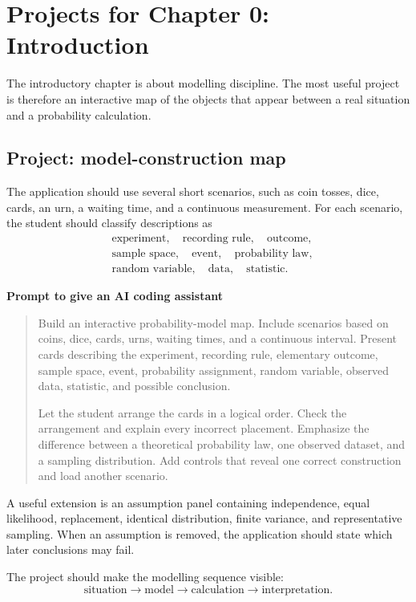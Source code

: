 \section{Projects for Chapter 0: Introduction}

The introductory chapter is about modelling discipline. The most useful project is therefore an interactive map of the objects that appear between a real situation and a probability calculation.

\subsection*{Project: model-construction map}

The application should use several short scenarios, such as coin tosses, dice, cards, an urn, a waiting time, and a continuous measurement. For each scenario, the student should classify descriptions as
\[
\begin{aligned}
&\text{experiment},\quad \text{recording rule},\quad \text{outcome},\\
&\text{sample space},\quad \text{event},\quad \text{probability law},\\
&\text{random variable},\quad \text{data},\quad \text{statistic}.
\end{aligned}
\]

\begin{examplebox}
\textbf{Prompt to give an AI coding assistant}

\begin{quote}\small
Build an interactive probability-model map. Include scenarios based on coins, dice, cards, urns, waiting times, and a continuous interval. Present cards describing the experiment, recording rule, elementary outcome, sample space, event, probability assignment, random variable, observed data, statistic, and possible conclusion.

Let the student arrange the cards in a logical order. Check the arrangement and explain every incorrect placement. Emphasize the difference between a theoretical probability law, one observed dataset, and a sampling distribution. Add controls that reveal one correct construction and load another scenario.
\end{quote}
\end{examplebox}

A useful extension is an assumption panel containing independence, equal likelihood, replacement, identical distribution, finite variance, and representative sampling. When an assumption is removed, the application should state which later conclusions may fail.

\begin{summarybox}
The project should make the modelling sequence visible:
\[
\text{situation}\longrightarrow\text{model}\longrightarrow\text{calculation}\longrightarrow\text{interpretation}.
\]
\end{summarybox}
